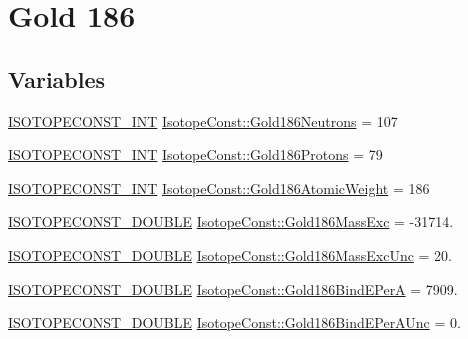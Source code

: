 \hypertarget{group___isotope_const-_gold-_au186}{}\section{Gold 186}
\label{group___isotope_const-_gold-_au186}
\subsection*{Variables}
\begin{DoxyCompactItemize}
\item 
\mbox{\hyperlink{group___isotope_const-_macros_ga5f18360b3e99483a35c32d789e62621c}{I\+S\+O\+T\+O\+P\+E\+C\+O\+N\+S\+T\+\_\+\+I\+NT}} \mbox{\hyperlink{group___isotope_const-_gold-_au186_ga75c93f8ca1e9ee3bcd3e16854a90b66a}{Isotope\+Const\+::\+Gold186\+Neutrons}} = 107
\item 
\mbox{\hyperlink{group___isotope_const-_macros_ga5f18360b3e99483a35c32d789e62621c}{I\+S\+O\+T\+O\+P\+E\+C\+O\+N\+S\+T\+\_\+\+I\+NT}} \mbox{\hyperlink{group___isotope_const-_gold-_au186_ga8193f09f30eb39b1f200f865ff0fc4d9}{Isotope\+Const\+::\+Gold186\+Protons}} = 79
\item 
\mbox{\hyperlink{group___isotope_const-_macros_ga5f18360b3e99483a35c32d789e62621c}{I\+S\+O\+T\+O\+P\+E\+C\+O\+N\+S\+T\+\_\+\+I\+NT}} \mbox{\hyperlink{group___isotope_const-_gold-_au186_ga19a288bfa88b00698bb3e51ea166ebcc}{Isotope\+Const\+::\+Gold186\+Atomic\+Weight}} = 186
\item 
\mbox{\hyperlink{group___isotope_const-_macros_ga8f45a7272ce02c0b4c65c44636ed719a}{I\+S\+O\+T\+O\+P\+E\+C\+O\+N\+S\+T\+\_\+\+D\+O\+U\+B\+LE}} \mbox{\hyperlink{group___isotope_const-_gold-_au186_ga91d5cde5709796de93050cc4f9f4c274}{Isotope\+Const\+::\+Gold186\+Mass\+Exc}} = -\/31714.
\item 
\mbox{\hyperlink{group___isotope_const-_macros_ga8f45a7272ce02c0b4c65c44636ed719a}{I\+S\+O\+T\+O\+P\+E\+C\+O\+N\+S\+T\+\_\+\+D\+O\+U\+B\+LE}} \mbox{\hyperlink{group___isotope_const-_gold-_au186_ga84b4cf132c0085fc555ce2b4716ac4af}{Isotope\+Const\+::\+Gold186\+Mass\+Exc\+Unc}} = 20.
\item 
\mbox{\hyperlink{group___isotope_const-_macros_ga8f45a7272ce02c0b4c65c44636ed719a}{I\+S\+O\+T\+O\+P\+E\+C\+O\+N\+S\+T\+\_\+\+D\+O\+U\+B\+LE}} \mbox{\hyperlink{group___isotope_const-_gold-_au186_gabe1623771628882a73289aac3228506d}{Isotope\+Const\+::\+Gold186\+Bind\+E\+PerA}} = 7909.
\item 
\mbox{\hyperlink{group___isotope_const-_macros_ga8f45a7272ce02c0b4c65c44636ed719a}{I\+S\+O\+T\+O\+P\+E\+C\+O\+N\+S\+T\+\_\+\+D\+O\+U\+B\+LE}} \mbox{\hyperlink{group___isotope_const-_gold-_au186_ga78c6edae20c2c1e34a9126fdcd9622cc}{Isotope\+Const\+::\+Gold186\+Bind\+E\+Per\+A\+Unc}} = 0.

\end{DoxyCompactItemize}
